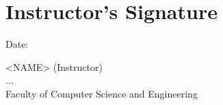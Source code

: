 \chapter*{Instructor’s Signature}

\vspace{1cm}

\makebox[0.7\linewidth][l]{\hrulefill} Date: \makebox[0.2\linewidth][l]{\hrulefill}

    \begin{flushleft}
    <NAME> (Instructor)\\
    ... \\
    Faculty of Computer Science and Engineering
    \end{flushleft}